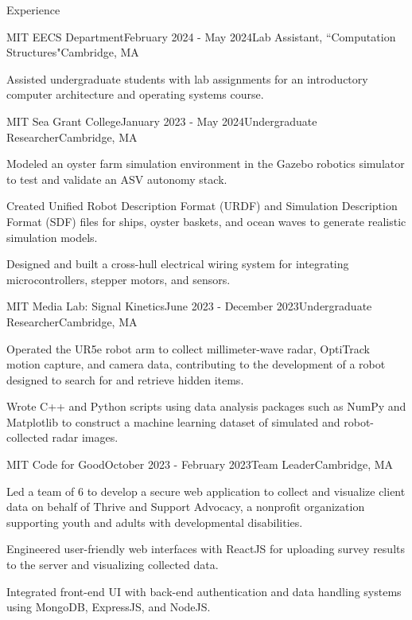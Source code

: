 \documentclass[
	10pt,
]{resume}
\begin{document}
\begin{rSection}{Experience}
	\begin{rSubsection}{MIT EECS Department}{February 2024 - May 2024}{Lab Assistant, ``Computation Structures"}{Cambridge, MA}
    \item Assisted undergraduate students with lab assignments for an introductory computer architecture and operating systems course.
	\end{rSubsection}

	\begin{rSubsection}{MIT Sea Grant College}{January 2023 - May 2024}{Undergraduate Researcher}{Cambridge, MA}
    \item Modeled an oyster farm simulation environment in the Gazebo robotics simulator to test and validate an ASV autonomy stack.
    \item Created Unified Robot Description Format (URDF) and Simulation Description Format (SDF) files for ships, oyster baskets, and ocean waves to generate realistic simulation models.
    \item Designed and built a cross-hull electrical wiring system for integrating microcontrollers, stepper motors, and sensors.
    \end{rSubsection}

	\begin{rSubsection}{MIT Media Lab: Signal Kinetics}{June 2023 - December 2023}{Undergraduate Researcher}{Cambridge, MA}
    \item Operated the UR5e robot arm to collect millimeter-wave radar, OptiTrack motion capture, and camera data, contributing to the development of a robot designed to search for and retrieve hidden items.
    \item Wrote C++ and Python scripts using data analysis packages such as NumPy and Matplotlib to construct a machine learning dataset of simulated and robot-collected radar images.
	\end{rSubsection}

	\begin{rSubsection}{MIT Code for Good}{October 2023 - February 2023}{Team Leader}{Cambridge, MA}
	\item Led a team of 6 to develop a secure web application to collect and visualize client data on behalf of Thrive and Support Advocacy, a nonprofit organization supporting youth and adults with developmental disabilities.
	\item Engineered user-friendly web interfaces with ReactJS for uploading survey results to the server and visualizing collected data.
    \item Integrated front-end UI with back-end authentication and data handling systems using MongoDB, ExpressJS, and NodeJS.
	\end{rSubsection}


\end{rSection}
\end{document}
